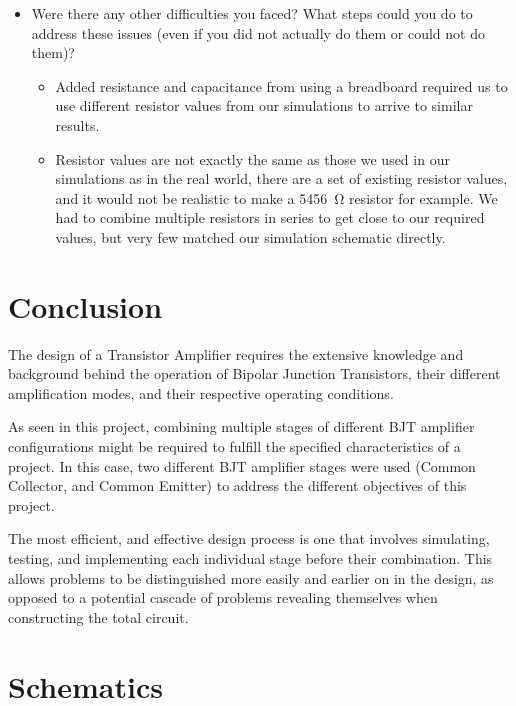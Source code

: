 \documentclass[12pt]{article}
\begin{document}
\begin{itemize}
\begin{itemize}
    \end{itemize}
    \item Were there any other difficulties you faced? What steps could you do to address these issues (even if you did not actually do them or could not do them)?
    \begin{itemize}
        \item Added resistance and capacitance from using a breadboard required us to use different resistor values from our simulations to arrive to similar results.
        \item Resistor values are not exactly the same as those we used in our simulations as in the real world, there are a set of existing resistor values, and it would not be realistic to make a \SI{5456}{\ohm} resistor for example. We had to combine multiple resistors in series to get close to our required values, but very few matched our simulation schematic directly.
    \end{itemize}
\end{itemize}
\section{Conclusion}
The design of a Transistor Amplifier requires the extensive knowledge and background behind the operation of Bipolar Junction Transistors, their different amplification modes, and their respective operating conditions.

As seen in this project, combining multiple stages of different BJT amplifier configurations might be required to fulfill the specified characteristics of a project. In this case, two different BJT amplifier stages were used (Common Collector, and Common Emitter) to address the different objectives of this project.

The most efficient, and effective design process is one that involves simulating, testing, and implementing each individual stage before their combination. This allows problems to be distinguished more easily and earlier on in the design, as opposed to a potential cascade of problems revealing themselves when constructing the total circuit. 

\newpage
\appendix

\section{Schematics}
\end{document}
